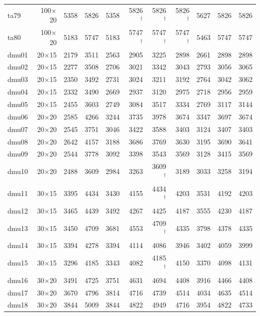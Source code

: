 {\begin{longtable}{lrrrrrrrrrr}
ta79 & 100$\times$20 & 5358 & 5826 & 5358 & 5826$^\dagger$ & 5826$^\dagger$ & 5826$^\dagger$ & 5627 & 5826 & 5826 \\
ta80 & 100$\times$20 & 5183 & 5747 & 5183 & 5747$^\dagger$ & 5747$^\dagger$ & 5747$^\dagger$ & 5463 & 5747 & 5747 \\
dmu01 & 20$\times$15 & 2179 & 3511 & 2563 & 2905 & 3225 & 2898 & 2661 & 2898 & 2898 \\
dmu02 & 20$\times$15 & 2277 & 3508 & 2706 & 3021 & 3342 & 3043 & 2793 & 3056 & 3065 \\
dmu03 & 20$\times$15 & 2350 & 3492 & 2731 & 3024 & 3211 & 3192 & 2764 & 3042 & 3062 \\
dmu04 & 20$\times$15 & 2332 & 3490 & 2669 & 2937 & 3120 & 2975 & 2718 & 2956 & 2959 \\
dmu05 & 20$\times$15 & 2455 & 3603 & 2749 & 3084 & 3517 & 3334 & 2769 & 3117 & 3144 \\
dmu06 & 20$\times$20 & 2585 & 4266 & 3244 & 3735 & 3978 & 3674 & 3347 & 3697 & 3674 \\
dmu07 & 20$\times$20 & 2545 & 3751 & 3046 & 3422 & 3588 & 3403 & 3124 & 3407 & 3403 \\
dmu08 & 20$\times$20 & 2642 & 4157 & 3188 & 3686 & 3769 & 3630 & 3195 & 3690 & 3641 \\
dmu09 & 20$\times$20 & 2544 & 3778 & 3092 & 3398 & 3543 & 3569 & 3128 & 3415 & 3569 \\
dmu10 & 20$\times$20 & 2488 & 3609 & 2984 & 3263 & 3609$^\dagger$ & 3189 & 3033 & 3258 & 3194 \\
dmu11 & 30$\times$15 & 3395 & 4434 & 3430 & 4155 & 4434$^\dagger$ & 4203 & 3531 & 4192 & 4203 \\
dmu12 & 30$\times$15 & 3465 & 4439 & 3492 & 4267 & 4425 & 4187 & 3555 & 4230 & 4187 \\
dmu13 & 30$\times$15 & 3450 & 4709 & 3681 & 4553 & 4709$^\dagger$ & 4335 & 3798 & 4378 & 4335 \\
dmu14 & 30$\times$15 & 3394 & 4278 & 3394 & 4114 & 4086 & 3946 & 3402 & 4059 & 3999 \\
dmu15 & 30$\times$15 & 3296 & 4185 & 3343 & 4082 & 4185$^\dagger$ & 4150 & 3370 & 4098 & 4131 \\
dmu16 & 30$\times$20 & 3491 & 4725 & 3751 & 4631 & 4694 & 4408 & 3916 & 4466 & 4408 \\
dmu17 & 30$\times$20 & 3670 & 4796 & 3814 & 4716 & 4739 & 4514 & 4034 & 4635 & 4514 \\
dmu18 & 30$\times$20 & 3844 & 5009 & 3844 & 4822 & 4949 & 4716 & 3954 & 4822 & 4733 \\

\end{longtable}}
